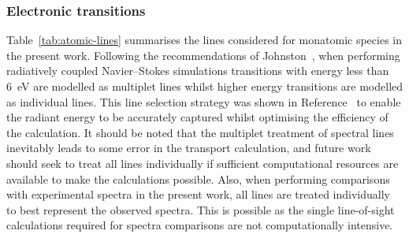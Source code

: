 \subsubsection{Electronic transitions}

Table~\ref{tab:atomic-lines} summarises the lines considered for monatomic species in the present work.
Following the recommendations of Johnston~\cite{JohnPhd}, when performing radiatively coupled Navier--Stokes simulations transitions with energy less than 6~eV are modelled as multiplet lines whilst higher energy transitions are modelled as individual lines.
This line selection strategy was shown in Reference~\cite{JohnPhd} to enable the radiant energy to be accurately captured whilst optimising the efficiency of the calculation.
It should be noted that the multiplet treatment of spectral lines inevitably leads to some error in the transport calculation, and future work should seek to treat all lines individually if sufficient computational resources are available to make the calculations possible.
Also, when performing comparisons with experimental spectra in the present work, all lines are treated individually to best represent the observed spectra.
This is possible as the single line-of-sight calculations required for spectra comparisons are not computationally intensive.

